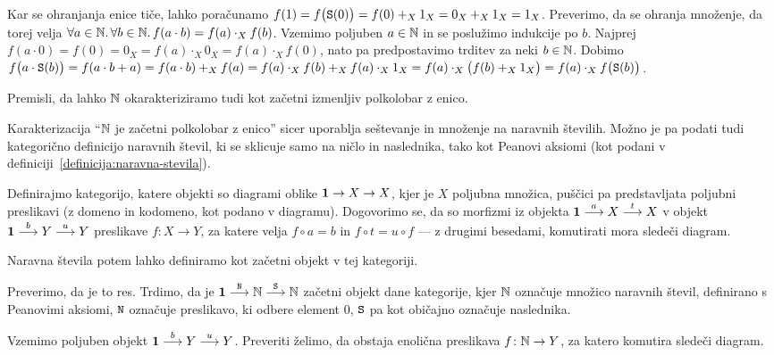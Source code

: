 Kar se ohranjanja enice tiče, lahko poračunamo $f(1) = f\big(\mathtt{S}(0)\big) = f(0) +_X 1_X = 0_X +_X 1_X = 1_X$. Preverimo, da se ohranja množenje, da torej velja $\forall a \in \mathbb{N} .\,\forall b \in \mathbb{N} .\,{f(a \cdot b) = f(a) \cdot_X f(b)}$. Vzemimo poljuben $a \in \mathbb{N}$ in se poslužimo indukcije po $b$. Najprej $f(a \cdot 0) = f(0) = 0_X = f(a) \cdot_X 0_X = f(a) \cdot_X f(0)$, nato pa predpostavimo trditev za neki $b \in \mathbb{N}$. Dobimo $f\big(a \cdot \mathtt{S}(b)\big) = f(a \cdot b + a) = f(a \cdot b) +_X f(a) = f(a) \cdot_X f(b) +_X f(a) \cdot_X 1_X = f(a) \cdot_X \big(f(b) +_X 1_X\big) = f(a) \cdot_X f\big(\mathtt{S}(b)\big)$.

\begin{naloga}
Premisli, da lahko $\mathbb{N}$ okarakteriziramo tudi kot začetni izmenljiv polkolobar z enico.
\end{naloga}

Karakterizacija ``$\mathbb{N}$ je začetni polkolobar z enico'' sicer uporablja seštevanje in množenje na naravnih številih. Možno je pa podati tudi kategorično definicijo naravnih števil, ki se sklicuje samo na ničlo in naslednika, tako kot Peanovi aksiomi (kot podani v definiciji~\ref{definicija:naravna-stevila}).

Definirajmo kategorijo, katere objekti so diagrami oblike $\mathtt{\mathbf{1}} \to X \to X$, kjer je $X$ poljubna množica, puščici pa predstavljata poljubni preslikavi (z domeno in kodomeno, kot podano v diagramu). Dogovorimo se, da so morfizmi iz objekta $\mathtt{\mathbf{1}} \stackrel{a}{\longrightarrow} X \stackrel{t}{\longrightarrow} X$ v objekt $\mathtt{\mathbf{1}} \stackrel{b}{\longrightarrow} Y \stackrel{u}{\longrightarrow} Y$ preslikave $f\colon X \to Y$, za katere velja $f \circ a = b$ in $f \circ t = u \circ f$ --- z drugimi besedami, komutirati mora sledeči diagram.


Naravna števila potem lahko definiramo kot začetni objekt v tej kategoriji.

Preverimo, da je to res. Trdimo, da je $\mathtt{\mathbf{1}} \stackrel{\mathtt{N}}{\longrightarrow} \mathbb{N} \stackrel{\mathtt{S}}{\longrightarrow} \mathbb{N}$ začetni objekt dane kategorije, kjer $\mathbb{N}$ označuje množico naravnih števil, definirano s Peanovimi aksiomi, $\mathtt{N}$ označuje preslikavo, ki odbere element $0$, $\mathtt{S}$ pa kot običajno označuje naslednika.

Vzemimo poljuben objekt $\mathtt{\mathbf{1}} \stackrel{b}{\longrightarrow} Y \stackrel{u}{\longrightarrow} Y$. Preveriti želimo, da obstaja enolična preslikava $f\colon \mathbb{N} \to Y$, za katero komutira sledeči diagram.

